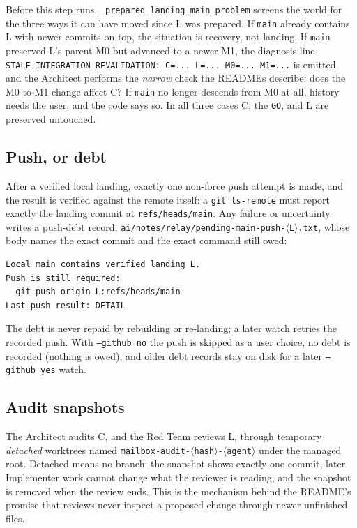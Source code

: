 \documentclass[10pt,aps,prd,twocolumn,nofootinbib]{revtex4-2}
\newcommand{\code}[1]{\texttt{#1}}
\newcommand{\file}[1]{\texttt{#1}}
\begin{document}
Before this step runs, \code{\_prepared\_landing\_main\_problem}
screens the world for the three ways it can have moved since L was
prepared.  If \code{main} already contains L with newer commits on
top, the situation is recovery, not landing.  If \code{main} preserved
L's parent M0 but advanced to a newer M1, the diagnosis line
\code{STALE\_INTEGRATION\_REVALIDATION: C=... L=... M0=... M1=...}
is emitted, and the Architect performs the \emph{narrow} check the
READMEs describe: does the M0-to-M1 change affect C?  If \code{main}
no longer descends from M0 at all, history needs the user, and the
code says so.  In all three cases C, the \code{GO}, and L are
preserved untouched.

\subsection{Push, or debt}

After a verified local landing, exactly one non-force push attempt is
made, and the result is verified against the remote itself: a
\code{git ls-remote} must report exactly the landing commit at
\code{refs/heads/main}.  Any failure or uncertainty writes a push-debt
record, \file{ai/notes/relay/pending-main-push-$\langle$L$\rangle$.txt},
whose body names the exact commit and the exact command still owed:

\begin{verbatim}
Local main contains verified landing L.
Push is still required:
  git push origin L:refs/heads/main
Last push result: DETAIL
\end{verbatim}

The debt is never repaid by rebuilding or re-landing; a later watch
retries the recorded push.  With \code{--github no} the push is
skipped as a user choice, no debt is recorded (nothing is owed), and
older debt records stay on disk for a later \code{--github yes} watch.

\subsection{Audit snapshots}

The Architect audits C, and the Red Team reviews L, through temporary
\emph{detached} worktrees named
\file{mailbox-audit-$\langle$hash$\rangle$-$\langle$agent$\rangle$}
under the managed root.  Detached means no branch: the snapshot shows
exactly one commit, later Implementer work cannot change what the
reviewer is reading, and the snapshot is removed when the review ends.
This is the mechanism behind the README's promise that reviews never
inspect a proposed change through newer unfinished files.
\end{document}
